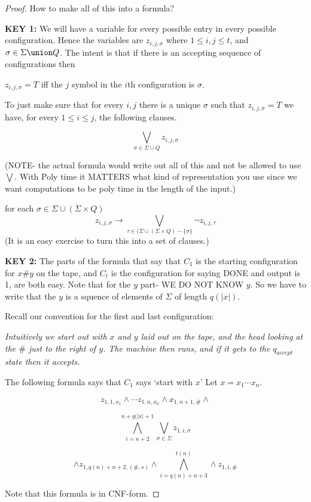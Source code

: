 \documentclass[12pt]{article}
\begin{document}
\begin{proof}
How to make all of this into a formula?

\noindent
{\bf KEY 1:} We will have a variable for every possible
entry in every possible configuration.
Hence the variables are $z_{i,j,\sigma}$
where $1\le i,j\le t$, and $\sigma \in \Sigma \union Q$.
The intent is that if there is an accepting sequence
of configurations then

$z_{i,j,\sigma} = T$ iff the $j$ symbol in the $i$th configuration
is $\sigma$.

To just make sure that for every $i,j$ there is a unique $\sigma$
such that $z_{i,j,\sigma}=T$ we have, for every $1\le i\le j$,
the following clauses.

$$\bigvee_{\sigma\in\Sigma\cup Q} z_{i,j,\sigma}$$



(NOTE- the actual formula would write out all of this and not be
allowed to use $\bigvee$. With Poly time it MATTERS what
kind of representation you use since we want computations to be
poly time in the length of the input.)

for each $\sigma\in \Sigma \cup  (\Sigma\times Q)$
$$z_{i,j,\sigma} \rightarrow \bigvee_{\tau \in (\Sigma \cup (\Sigma\times Q) - \{\sigma\} } \neg z_{i,j,\tau}$$
(It is an easy exercise to turn this into a set of clauses.)

\noindent
{\bf KEY 2:} The parts of the formula that say that $C_1$ is the
starting configuration for $x\#y$ on the tape, and $C_t$ is the
configuration for saying DONE and output is 1, are both easy.
Note that for the $y$ part- WE DO NOT KNOW $y$.
So we have to write that the $y$ is a squence of elements of $\Sigma$
of length $q(|x|)$.

Recall our convention for the first and last configuration:

{\it 
Intuitively we start out with $x$ and $y$ laid out on the tape,
and the head looking at the $\#$ just to the right of $y$.
The machine then runs, and if it gets to the $q_{accept}$ state
then it accepts.}

The following formula says that $C_1$ says `start with $x$'
Let $x=x_1\cdots x_n$.

$$z_{1,1,x_1} \wedge \cdots z_{1,n,x_n} \wedge x_{1,n+1,\#} \wedge$$

$$\bigwedge_{i=n+2}^{n+q(|x|+1} \bigvee_{\sigma\in \Sigma} z_{1,i,\sigma}$$

$$\wedge z_{1,q(n)+n+2,(\#,s)} \wedge \bigwedge_{i=q(n)+n+3}^{t(n)} \wedge z_{1,i,\#}$$

Note that this formula is in CNF-form.


\end{proof}
\end{document}
